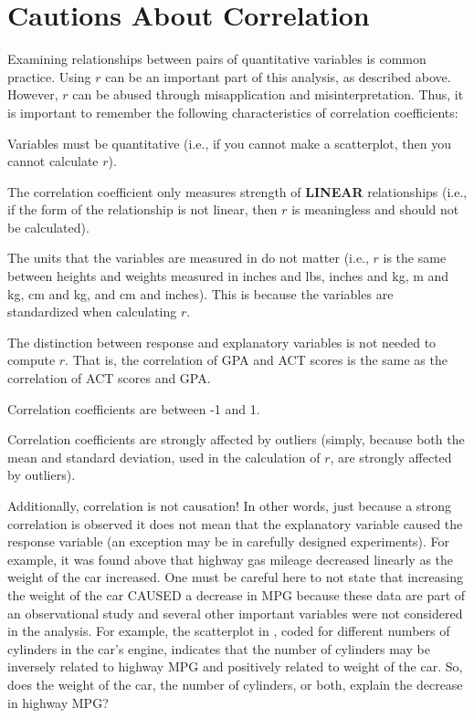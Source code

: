 \documentclass[10pt,openany]{book}\usepackage[]{graphicx}\usepackage[]{color}
\begin{document}
\section{Cautions About Correlation}
\vspace{-6pt}
Examining relationships between pairs of quantitative variables is common practice. Using $r$ can be an important part of this analysis, as described above. However, $r$ can be abused through misapplication and misinterpretation. Thus, it is important to remember the following characteristics of correlation coefficients:
\vspace{-12pt}
\begin{Itemize}
  \item Variables must be quantitative (i.e., if you cannot make a scatterplot, then you cannot calculate $r$).
  \item The correlation coefficient only measures strength of \textbf{LINEAR} relationships (i.e., if the form of the relationship is not linear, then $r$ is meaningless and should not be calculated).
  \item The units that the variables are measured in do not matter (i.e., $r$ is the same between heights and weights measured in inches and lbs, inches and kg, m and kg, cm and kg, and cm and inches). This is because the variables are standardized when calculating $r$.
  \item The distinction between response and explanatory variables is not needed to compute $r$. That is, the correlation of GPA and ACT scores is the same as the correlation of ACT scores and GPA.
  \item Correlation coefficients are between -1 and 1.
  \item Correlation coefficients are strongly affected by outliers (simply, because both the mean and standard deviation, used in the calculation of $r$, are strongly affected by outliers).
\end{Itemize}

Additionally, correlation is not causation! In other words, just because a strong correlation is observed it does not mean that the explanatory variable caused the response variable (an exception may be in carefully designed experiments). For example, it was found above that highway gas mileage decreased linearly as the weight of the car increased. One must be careful here to not state that increasing the weight of the car CAUSED a decrease in MPG because these data are part of an observational study and several other important variables were not considered in the analysis. For example, the scatterplot in , coded for different numbers of cylinders in the car's engine, indicates that the number of cylinders may be inversely related to highway MPG and positively related to weight of the car. So, does the weight of the car, the number of cylinders, or both, explain the decrease in highway MPG?
\end{document}
